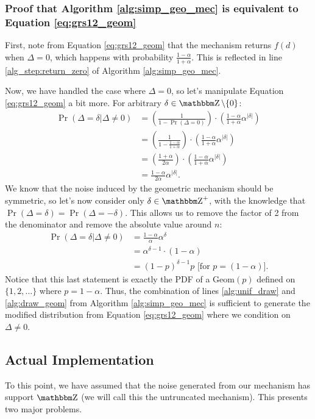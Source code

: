 \documentclass[11pt]{scrartcl} %
\begin{document}
\subsubsection{Proof that Algorithm \ref{alg:simp_geo_mec} is equivalent to Equation \eqref{eq:grs12_geom}}
First, note from Equation \eqref{eq:grs12_geom} that the mechanism returns $f(d)$ when $\Delta=0$,
which happens with probability $\frac{1-\alpha}{1+\alpha}$.
This is reflected in line \ref{alg_step:return_zero} of Algorithm \ref{alg:simp_geo_mec}. \newline

Now, we have handled the case where $\Delta = 0$, so let's manipulate Equation \eqref{eq:grs12_geom} a bit more.
For arbitrary $\delta \in \Z \setminus \{0\}$:
\begin{align*}
    \Pr(\Delta = \delta \vert \Delta \neq 0) &= \left( \frac{1}{1 - \Pr(\Delta = 0)} \right) \cdot \left( \frac{1-\alpha}{1+\alpha} \alpha^{| \delta |} \right) \\
               &= \left( \frac{1}{1 - \frac{1-\alpha}{1+\alpha}} \right) \cdot \left( \frac{1-\alpha}{1+\alpha} \alpha^{| \delta |} \right) \\
               &= \left( \frac{1 + \alpha}{2\alpha} \right) \cdot \left( \frac{1-\alpha}{1+\alpha} \alpha^{| \delta |} \right) \\
               &= \frac{1-\alpha}{2\alpha} \alpha^{|\delta|}.
\end{align*}
We know that the noise induced by the geometric mechanism should be symmetric, so let's now
consider only $\delta \in \Z^{+}$, with the knowledge that $\Pr(\Delta=\delta) = \Pr(\Delta=-\delta)$. This allows us
to remove the factor of 2 from the denominator and remove the absolute value around $n$:
\begin{align*}
    \Pr(\Delta = \delta | \Delta \neq 0) &= \frac{1-\alpha}{\alpha} \alpha^{\delta} \\
               &= \alpha^{\delta-1} \cdot (1-\alpha) \\
               &= (1-p)^{\delta-1} p \text{ [for $p = (1 - \alpha)$]}.
\end{align*}
Notice that this last statement is exactly the PDF of a Geom$(p)$ defined on $\{1,2,\hdots\}$ where
$p = 1-\alpha$. Thus, the combination of lines \ref{alg:unif_draw} and \ref{alg:draw_geom} from
Algorithm \ref{alg:simp_geo_mec} is sufficient to generate the modified distribution from
Equation \eqref{eq:grs12_geom} where we condition on $\Delta \neq 0$.

\subsection{Actual Implementation}
To this point, we have assumed that the noise generated from our mechanism has support
$\Z$ (we will call this the untruncated mechanism). This presents two major problems. \newline
\end{document}
